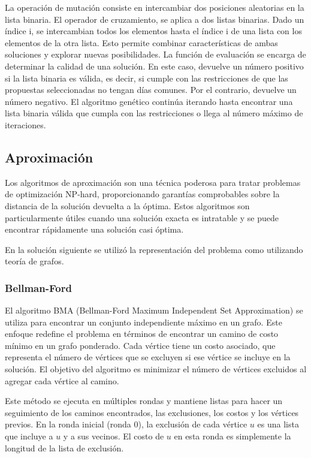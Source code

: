 \documentclass[10pt]{article} %
\begin{document}
	La operación de mutación consiste en intercambiar dos posiciones aleatorias en la lista binaria. El operador de cruzamiento, se aplica a dos listas binarias. Dado un índice i, se intercambian todos los elementos hasta el índice i de una lista con los elementos de la otra lista. Esto permite combinar características de ambas soluciones y explorar nuevas posibilidades. La función de evaluación se encarga de determinar la calidad de una solución. En este caso, devuelve un número positivo si la lista binaria es válida, es decir, si cumple con las restricciones de que las propuestas seleccionadas no tengan días comunes. Por el contrario, devuelve un número negativo.  El algoritmo genético continúa iterando hasta encontrar una lista binaria válida que cumpla con las restricciones o llega al n\'umero m\'aximo de iteraciones.
	
	\subsection{Aproximaci\'on}
	
	Los algoritmos de aproximación son una técnica poderosa para tratar problemas de optimización NP-hard, proporcionando garantías comprobables sobre la distancia de la solución devuelta a la óptima. Estos algoritmos son particularmente útiles cuando una solución exacta es intratable y se puede encontrar rápidamente una solución casi óptima.
	
	En la soluci\'on siguiente se utiliz\'o la representaci\'on del problema como utilizando teor\'ia de grafos.
	
	\subsubsection{Bellman-Ford}
	
	El algoritmo BMA (Bellman-Ford Maximum Independent Set Approximation) se utiliza para encontrar un conjunto independiente máximo en un grafo. Este enfoque redefine el problema en términos de encontrar un camino de costo mínimo en un grafo ponderado. Cada vértice tiene un costo asociado, que representa el número de vértices que se excluyen si ese vértice se incluye en la solución. El objetivo del algoritmo es minimizar el número de vértices excluidos al agregar cada vértice al camino.
	
	Este m\'etodo se ejecuta en múltiples rondas y mantiene listas para hacer un seguimiento de los caminos encontrados, las exclusiones, los costos y los vértices previos. En la ronda inicial (ronda 0), la exclusión de cada vértice $u$ es una lista que incluye a $u$ y a sus vecinos. El costo de $u$ en esta ronda es simplemente la longitud de la lista de exclusión.
	
\end{document}
